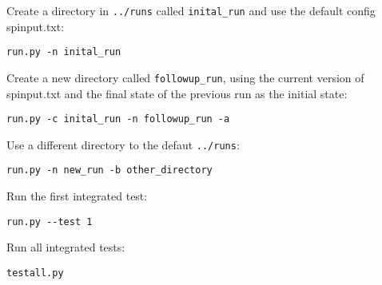 Create a directory in \texttt{../runs} called \texttt{inital\_run} and use the default
config spinput.txt:

\begin{verbatim}
run.py -n inital_run
\end{verbatim}

Create a new directory called \texttt{followup\_run}, using the current version of spinput.txt
and the final state of the previous run as the initial state:

\begin{verbatim}
run.py -c inital_run -n followup_run -a
\end{verbatim}

Use a different directory to the defaut \texttt{../runs}:

\begin{verbatim}
run.py -n new_run -b other_directory
\end{verbatim}

Run the first integrated test:

\begin{verbatim}
run.py --test 1
\end{verbatim}

Run all integrated tests:

\begin{verbatim}
testall.py
\end{verbatim}



